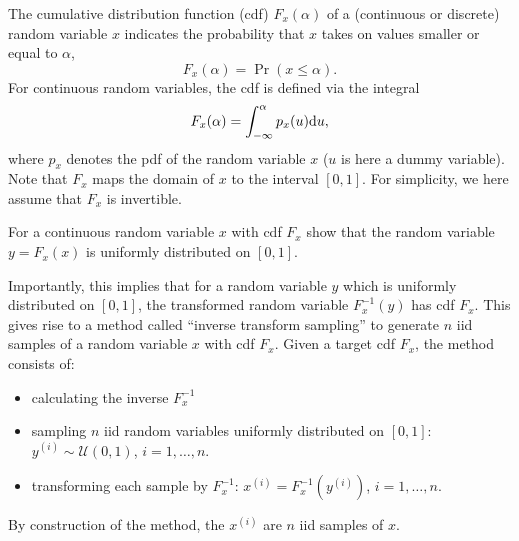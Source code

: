 \label{ex:ex1}
The cumulative distribution function (cdf) $F_x(\alpha)$ of a (continuous or
discrete) random variable $x$ indicates the probability that $x$ takes
on values smaller or equal to $\alpha$,
\begin{equation}
  F_x(\alpha) = \Pr( x \le \alpha).
\end{equation}
For continuous random variables, the cdf is defined via the integral
\begin{equation}
  F_x(\alpha) = \int_{-\infty}^{\alpha} p_x(u) \mathrm{d} u,
\end{equation}
where $p_x$ denotes the pdf of the random variable $x$ ($u$ is here a
dummy variable). Note that $F_x$ maps the domain of $x$ to the interval $[0,1]$. For simplicity, we here assume that $F_x$ is invertible.

For a continuous random variable $x$ with cdf $F_x$ show that the random variable $y = F_x(x)$ is uniformly distributed on $[0,1]$. 

Importantly, this implies that for a random variable $y$ which is
uniformly distributed on $[0,1]$, the transformed random variable
$F_x^{-1}(y)$ has cdf $F_x$. This gives rise to a method called
``inverse transform sampling'' to generate $n$ iid samples
of a random variable $x$ with cdf $F_x$.
%
Given a target cdf $F_x$, the method consists of:
\begin{itemize}
\item calculating the inverse $F_x^{-1}$
\item sampling $n$ iid random variables uniformly distributed on $[0,1]$: $y^{(i)} \sim \mathcal{U}(0,1)$, $i=1, \ldots, n$.
\item transforming each sample by $F_x^{-1}$: $x^{(i)} = F_x^{-1}(y^{(i)})$, $i=1, \ldots, n$.
\end{itemize}
By construction of the method, the $x^{(i)}$ are $n$ iid samples of $x$.
  
